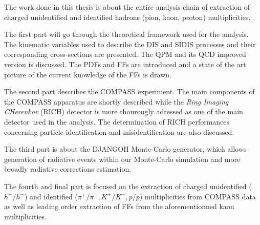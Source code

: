The work done in this thesis is about the entire analysis chain of extraction of charged unidentified and identified hadrons (pion, kaon, proton) multiplicities.

The first part will go through the theoretical framework used for the analysis. The kinematic variables used to describe the DIS and SIDIS processes and their corresponding cross-sections are presented. The QPM and its QCD improved version is discussed. The PDFs and FFs are introduced and a state of the art picture of the current knowledge of the FFs is drawn.

The second part describes the COMPASS experiment. The main components of the COMPASS apparatus are shortly described while the \textit{Ring Imaging CHerenkov} (RICH) detector is more thourougly adressed as one of the main detector used in the analysis. The determination of RICH performances concerning particle identification and misidentification are also discussed.

The third part is about the DJANGOH Monte-Carlo generator, which allows generation of radiative events within our Monte-Carlo simulation and more broadly radiative corrections estimation.

The fourth and final part is focused on the extraction of charged unidentified ($h^+/h^-$) and identified ($\pi^+/\pi^-,K^+/K^-,p/\bar{p}$) multiplicities from COMPASS data as well as leading order extraction of FFs from the aforementionned kaon multiplicities.
